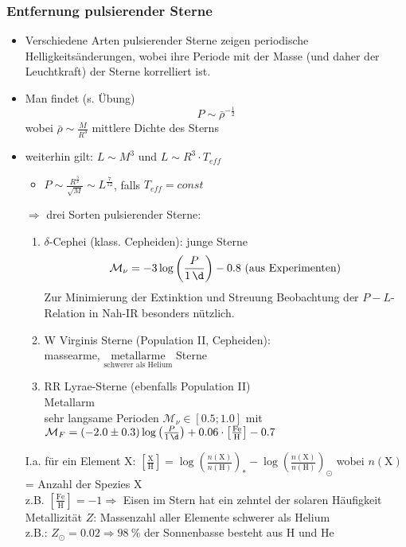 \subsubsection{Entfernung pulsierender Sterne}
\begin{itemize}
	\item Verschiedene Arten pulsierender Sterne zeigen periodische Helligkeitsänderungen, wobei ihre Periode mit der Masse (und daher der Leuchtkraft) der Sterne korrelliert ist.
	\item Man findet (s. Übung)
		\begin{equation*}
			P  \sim \bar{\rho}^{-\frac{1}{2}}
		\end{equation*}
		wobei $\bar{\rho}\sim\frac{M}{R^3}$ mittlere Dichte des Sterns
	\item weiterhin gilt: $L\sim M^3$ und $L\sim R^3\cdot T_{eff}$
		\begin{itemize}
			\item $P\sim\frac{R^\frac{3}{2}}{\sqrt{M}}\sim L^\frac{7}{12}$, falls $T_{eff}=const$
		\end{itemize}
	\item[$\Rightarrow$] drei Sorten pulsierender Sterne:
		\begin{enumerate}[label={$(\roman*)$}]
			\item $\delta$-Cephei (klass. Cepheiden): junge Sterne
				\begin{equation*}
					\mathcal{M}_\nu =-3\log\left(\frac{P}{\SI{1}{\d}}\right)-\num{0.8} \ \text{(aus Experimenten)}
				\end{equation*}
				Zur Minimierung der Extinktion und Streuung Beobachtung der $P-L$-Relation in Nah-IR besonders nützlich.
			\item W Virginis Sterne (Population II, Cepheiden):\\
				massearme, $\underset{\text{schwerer als Helium}}{\text{metallarme}}$ Sterne
			\item RR Lyrae-Sterne (ebenfalls Population II)\\
				Metallarm\\
				sehr langsame Perioden $\mathcal{M}_\nu \in [\num{0.5};\num{1.0}]$ mit $\mathcal{M}_F=(-\num{2.0}\pm\num{0.3})\log\left(\frac{P}{\SI{1}{\d}}\right)+\num{0.06}\cdot\left[\frac{\text{Fe}}{\text{H}}\right]-\num{0.7}$
		\end{enumerate}
		I.a. für ein Element X: $\left[\frac{\text{X}}{\text{H}}\right]=\log\left(\frac{n(\text{X})}{n(\text{H})}\right)_\ast-\log\left(\frac{n(\text{X})}{n(\text{H})}\right)_\odot$ wobei $n(\text{X})$= Anzahl der Spezies X\\
		z.B. $\left[\frac{\text{Fe}}{\text{H}}\right]=-\num{1}\Rightarrow$ Eisen im Stern hat ein zehntel der solaren Häufigkeit\\
		Metallizität $Z$: Massenzahl aller Elemente schwerer als Helium\\
		z.B.: $Z_\odot=\num{0.02}\Rightarrow \SI{98}{\%}$ der Sonnenbasse besteht aus H und He
\end{itemize}
